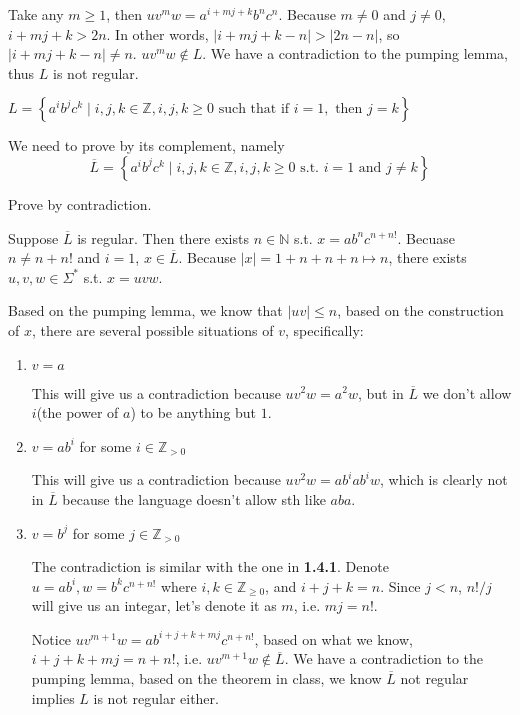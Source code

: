 \documentclass[a4paper]{article}
\newcommand{\N}{\mathbb{N}}
\newcommand{\Z}{\mathbb{Z}}
\begin{document}
Take any  $m\ge 1$, then $uv^mw=a^{i+mj+k}b^nc^n$. Because  $m \neq 0$ and $j\neq 0$, $i+mj+k > 2n$. In other words,  $|i+mj+k-n|>|2n-n|$, so  $|i+mj+k-n|\neq n$. $uv^mw \not\in L$. We have a contradiction to the pumping lemma, thus $L$ is not regular. 

\bigskip

\begin{tcolorbox}[enhanced,breakable,colback=white]
$L = \left\{a^{i} b^{j} c^{k} \mid i, j, k \in \mathbb{Z}, i, j, k \geq 0 \text { such that if } i=1, \text { then } j=k\right\}$ 
\end{tcolorbox}
We need to prove by its complement, namely \[
	\overline{L} = \left\{ a^ib^jc^k \mid i,j,k\in \Z, i,j,k\ge 0 \text{ s.t. } i=1 \text{ and } j \neq k \right\} 
\] 

Prove by contradiction.

Suppose $\overline{L}$ is regular. Then there exists $n \in \N$ s.t. $x=ab^nc^{n+n!}$. Becuase  $n\neq n+n!$ and $i=1$,  $x \in \overline{	L}$. Because $|x|=1+n+n+n\mapsto n$, there exists $u,v,w \in \Sigma^*$ s.t. $x=uvw$.

Based on the pumping lemma, we know that  $|uv|\le n$, based on the construction of $x$, there are several possible situations of $v$, specifically:
\begin{enumerate}
\item $v=a$

	This will give us a contradiction because  $uv^2w = a^2w$, but in  $\overline{L}$ we don't allow $i$(the power of  $a$) to be anything but  $1$.
\item  $v=ab^i$ for some  $i \in \Z_{>0}$ 

	This will give us a contradiction because $uv^2w=ab^iab^iw$, which is clearly not in  $\overline{L}$ because the language doesn't allow sth like $aba$.
\item  $v=b^j$ for some  $j \in \Z_{>0}$

	The contradiction is similar with the one in  \textbf{1.4.1}. Denote $u=ab^i,w=b^kc^{n+n!}$ where $i,k \in \Z_{\ge 0}$, and $i+j+k=n$. Since  $j<n$,  $n!/j$ will give us an integar, let's denote it as  $m$, i.e.  $mj=n!$.

	Notice  $uv^{m+1}w = ab^{i+j+k+mj}c^{n+n!}$, based on what we know,  $i+j+k+mj=n+n!$, i.e. $uv^{m+1}w \not\in \overline{L}$. We have a contradiction to the pumping lemma, based on the theorem in class, we know $\overline{L}$ not regular implies $L$ is not regular either.
	
\end{enumerate}
\end{document}

